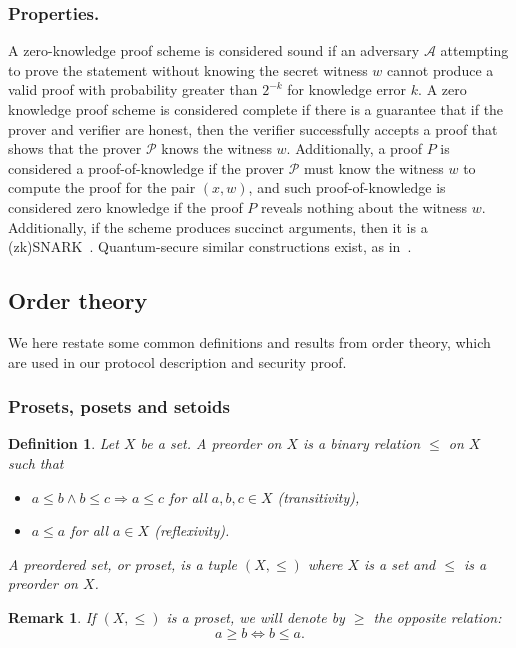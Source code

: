 \documentclass[runningheads]{llncs}
\newtheorem{defn}{Definition}
\newtheorem{rmk}{Remark}
\begin{document}
\subsubsection{Properties.} A zero-knowledge proof scheme is
considered sound if an adversary $\mathcal{A}$ attempting to prove
the statement without knowing the secret witness $w$ cannot produce a
valid proof with probability greater than $2^{-k}$ for knowledge
error $k$. A zero knowledge proof scheme is considered complete if
there is a guarantee that if the prover and verifier are honest, then
the verifier successfully accepts a proof that shows that the prover
$\mathcal{P}$ knows the witness $w$. Additionally, a proof $P$ is
considered a proof-of-knowledge if the prover $\mathcal{P}$ must know
the witness $w$ to compute the proof for the pair $(x, w)$, and such
proof-of-knowledge is considered zero knowledge if the proof $P$
reveals nothing about the witness $w$. Additionally, if the scheme
produces succinct arguments, then it is a
(zk)SNARK~\cite{supersonic,marlin,plonk,groth16,sonic}.
Quantum-secure similar constructions exist, as in~\cite{zkstarks,pq_zk}.

\subsection{Order theory}

We here restate some common definitions and results from order
theory, which are used in our protocol description and security proof.

\subsubsection{Prosets, posets and setoids}

\begin{defn}
  Let \(X\) be a set. A \emph{preorder on \(X\)} is a binary relation
  \(\leq\) on \(X\) such that
  \begin{itemize}
    \item \(a \leq b \wedge b \leq c \Rightarrow a \leq c\) for all
      \(a,b,c \in X\) (transitivity),
    \item \(a \leq a\) for all \(a \in X\) (reflexivity).
  \end{itemize}
  A \emph{preordered set}, or \emph{proset}, is a tuple \((X,\leq)\)
  where \(X\) is a set and \(\leq\) is a preorder on \(X\).
\end{defn}

\begin{rmk}
  If \((X,\leq)\) is a proset, we will denote by \(\geq\) the
  opposite relation: \[a \geq b \Leftrightarrow b \leq a.\]
\end{rmk}
\end{document}
